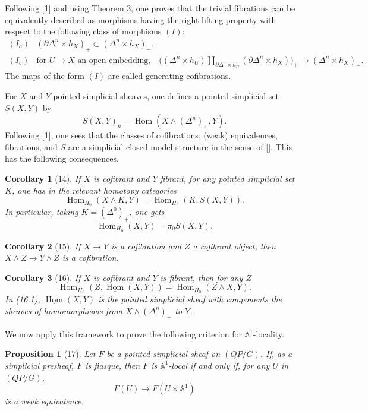 \documentclass[11pt]{article}
\newcommand{\Aone}{\mathbb A^1}
\newcommand{\Hom}{\operatorname{Hom}}
\theoremstyle{deligne}
\newtheorem*{proposition*}{Proposition}
\newtheorem*{corollary*}{Corollary}
\newcommand{\uHom}{\underline{\Hom}}
\begin{document}
Following [1] and using Theorem 3, one proves that the trivial fibrations can be equivalently described as morphisms having the right lifting property with respect to the following class of morphisms \((I)\):
\[
\begin{array}{ll}
(I_a) & (\partial\Delta^n\times h_X)_+\subset (\Delta^n\times h_X)_+,\\[0.4em]
(I_b) & \text{for } U\to X \text{ an open embedding,}\quad
\bigl((\Delta^n\times h_U)\coprod_{\partial\Delta^n\times h_U}(\partial\Delta^n\times h_X)\bigr)_+
\longrightarrow (\Delta^n\times h_X)_+.
\end{array}
\]
The maps of the form \((I)\) are called generating cofibrations.

For \(X\) and \(Y\) pointed simplicial sheaves, one defines a pointed simplicial set \(S(X,Y)\) by
\[
S(X,Y)_n=\Hom(X\wedge(\Delta^n)_+,Y).
\]
Following [1], one sees that the classes of cofibrations, (weak) equivalences, fibrations, and \(S\) are a simplicial closed model structure in the sense of []. This has the following consequences.

\begin{corollary*}[14]
If \(X\) is cofibrant and \(Y\) fibrant, for any pointed simplicial set \(K\), one has in the relevant homotopy categories
\[
\Hom_{H_0}(X\wedge K,Y)=\Hom_{H_0}(K,S(X,Y)).
\]
In particular, taking \(K=(\Delta^0)_+\), one gets
\[
\Hom_{H_0}(X,Y)=\pi_0S(X,Y).
\]
\end{corollary*}

\begin{corollary*}[15]
If \(X\to Y\) is a cofibration and \(Z\) a cofibrant object, then \(X\wedge Z\to Y\wedge Z\) is a cofibration.
\end{corollary*}

\begin{corollary*}[16]
If \(X\) is cofibrant and \(Y\) is fibrant, then for any \(Z\)
\[
\Hom_{H_0}(Z,\uHom(X,Y))=\Hom_{H_0}(Z\wedge X,Y). \tag{16.1}
\]
In (16.1), \(\uHom(X,Y)\) is the pointed simplicial sheaf with components the sheaves of homomorphisms from \(X\wedge(\Delta^n)_+\) to \(Y\).
\end{corollary*}

We now apply this framework to prove the following criterion for \(\Aone\)-locality.

\begin{proposition*}[17]
Let \(F\) be a pointed simplicial sheaf on \((QP/G)\). If, as a simplicial presheaf, \(F\) is flasque, then \(F\) is \(\Aone\)-local if and only if, for any \(U\) in \((QP/G)\),
\[
F(U)\longrightarrow F(U\times\Aone)
\]
is a weak equivalence.
\end{proposition*}
\end{document}
